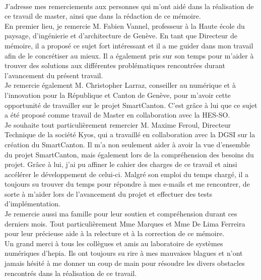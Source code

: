 \documentclass[
11pt, %
twoside, %
french, %
singlespacing, %
nolistspacing, %
headsepline, %
]{MastersDoctoralThesis} %
\begin{document}
\cleardoublepage


\begin{acknowledgements}
~\\

J'adresse mes remerciements aux personnes qui m'ont aidé dans la réalisation de ce travail de master, ainsi que dans la rédaction de ce mémoire.\\

En premier lieu, je remercie M. Fabien Vannel, professeur à la Haute école du paysage, d’ingénierie et d’architecture de Genève. En tant que Directeur de mémoire, il a proposé ce sujet fort intéressant et il a me guider dans mon travail afin de le concrétiser au mieux. Il a également pris sur son temps pour m'aider à trouver des solutions aux différentes problématiques rencontrées durant l'avancement du présent travail.\\

Je remercie également M. Christopher Larraz, conseiller au numérique et à l'innovation pour la République et Canton de Genève, pour m'avoir cette opportunité de travailler sur le projet SmartCanton. C'est grâce à lui que ce sujet a été proposé comme travail de Master en collaboration avec la HES-SO.\\

Je souhaite tout particulièrement remercier M. Maxime Feroul, Directeur Technique de la société Kyos, qui a travaillé en collaboration avec la DGSI sur la création du SmartCanton. Il m'a non seulement aider à avoir la vue d'ensemble du projet SmartCanton, mais également lors de la compréhension des besoins du projet. Grâce à lui, j'ai pu affiner le cahier des charges de ce travail et ainsi accélérer le développement de celui-ci. Malgré son emploi du temps chargé, il a toujours su trouver du temps pour répondre à mes e-mails et me rencontrer, de sorte à m'aider lors de l'avancement du projet et effectuer des tests d'implémentation.\\

Je remercie aussi ma famille pour leur soutien et compréhension durant ces derniers mois. Tout particulièrement Mme Marques et Mme De Lima Ferreira pour leur précieuse aide à la relecture et à la correction de ce mémoire.\\

Un grand merci à tous les collègues et amis au laboratoire de systèmes numériques d'hepia. Ils ont toujours su rire à mes mauvaises blagues et n'ont jamais hésité à me donner un coup de main pour résoudre les divers obstacles rencontrés dans la réalisation de ce travail.
\end{acknowledgements}
\cleardoublepage
\end{document}
